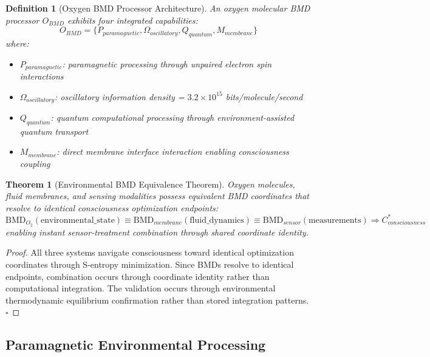 \documentclass[12pt,a4paper]{article}
\newtheorem{theorem}{Theorem}
\newtheorem{definition}{Definition}
\begin{document}
\begin{definition}[Oxygen BMD Processor Architecture]
An oxygen molecular BMD processor $O_{BMD}$ exhibits four integrated capabilities:
\begin{equation}
O_{BMD} = \{P_{paramagnetic}, \Omega_{oscillatory}, Q_{quantum}, M_{membrane}\}
\end{equation}
where:
\begin{itemize}
\item $P_{paramagnetic}$: paramagnetic processing through unpaired electron spin interactions
\item $\Omega_{oscillatory}$: oscillatory information density = $3.2 \times 10^{15}$ bits/molecule/second
\item $Q_{quantum}$: quantum computational processing through environment-assisted quantum transport
\item $M_{membrane}$: direct membrane interface interaction enabling consciousness coupling
\end{itemize}
\end{definition}

\begin{theorem}[Environmental BMD Equivalence Theorem]
Oxygen molecules, fluid membranes, and sensing modalities possess equivalent BMD coordinates that resolve to identical consciousness optimization endpoints:
\begin{equation}
\text{BMD}_{O_2}(\text{environmental\_state}) \equiv \text{BMD}_{membrane}(\text{fluid\_dynamics}) \equiv \text{BMD}_{sensor}(\text{measurements}) \Rightarrow C^*_{consciousness}
\end{equation}
enabling instant sensor-treatment combination through shared coordinate identity.
\end{theorem}

\begin{proof}
All three systems navigate consciousness toward identical optimization coordinates through S-entropy minimization. Since BMDs resolve to identical endpoints, combination occurs through coordinate identity rather than computational integration. The validation occurs through environmental thermodynamic equilibrium confirmation rather than stored integration patterns. $\square$
\end{proof}

\subsection{Paramagnetic Environmental Processing}
\end{document}
